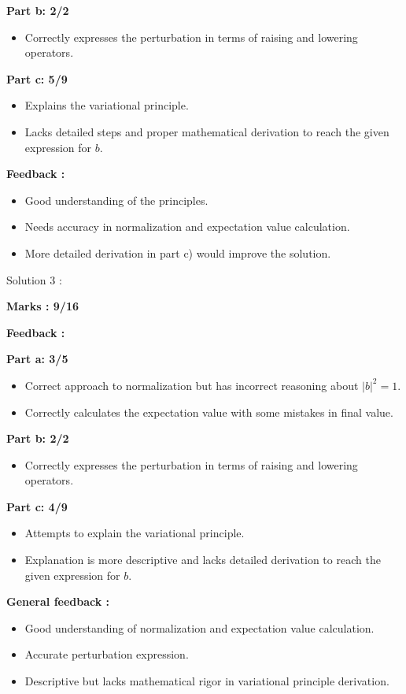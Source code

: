 \documentclass[a4paper,11pt]{article}
\begin{document}
\textbf{Part b: 2/2}
\begin{itemize}
    \item Correctly expresses the perturbation in terms of raising and lowering operators.
\end{itemize}

\textbf{Part c: 5/9}
\begin{itemize}
    \item Explains the variational principle.
    \item Lacks detailed steps and proper mathematical derivation to reach the given expression for $b$.
\end{itemize}

\textbf{Feedback :}
\begin{itemize}
    \item Good understanding of the principles.
    \item Needs accuracy in normalization and expectation value calculation.
    \item More detailed derivation in part c) would improve the solution.
\end{itemize}



Solution 3 :

\textbf{Marks : 9/16}

\textbf{Feedback :}

\textbf{Part a: 3/5}
\begin{itemize}
    \item Correct approach to normalization but has incorrect reasoning about $|b|^2 = 1$.
    \item Correctly calculates the expectation value with some mistakes in final value.
\end{itemize}

\textbf{Part b: 2/2}
\begin{itemize}
    \item Correctly expresses the perturbation in terms of raising and lowering operators.
\end{itemize}

\textbf{Part c: 4/9}
\begin{itemize}
    \item Attempts to explain the variational principle.
    \item Explanation is more descriptive and lacks detailed derivation to reach the given expression for $b$.
\end{itemize}

\textbf{General feedback :}
\begin{itemize}
    \item Good understanding of normalization and expectation value calculation.
    \item Accurate perturbation expression.
    \item Descriptive but lacks mathematical rigor in variational principle derivation.
\end{itemize}
\end{document}
